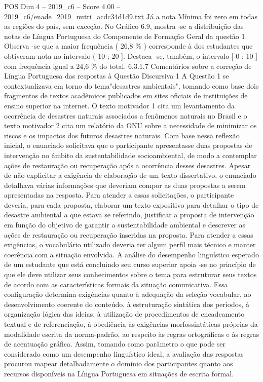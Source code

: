 \begin{textsample}{POS Dim 4 – 2019\_c6 – Score 4.00 – 2019\_c6/enade\_2019\_nutri\_acdc34d1d9.txt}
Já a nota Mínima foi zero em todas as regiões do país, sem exceção.
No Gráfico 6.9, mostra -se a distribuição das notas de Língua Portuguesa do Componente de Formação Geral da questão 1.
Observa -se que a maior frequência ( 26,8 \% ) corresponde à dos estudantes que obtiveram nota no intervalo ( 10 ; 20 ].
Destaca -se, também, o intervalo [ 0 ; 10 ] com frequência igual a 24,6 \% do total. 6.3.1.7 Comentários sobre a correção de Língua Portuguesa das respostas à Questão Discursiva 1 A Questão 1 se contextualizava em torno do tema"desastres ambientais", tomando como base dois fragmentos de textos acadêmicos publicados em sites oficiais de instituições de ensino superior na internet.
O texto motivador 1 cita um levantamento da ocorrência de desastres naturais associados a fenômenos naturais no Brasil e o texto motivador 2 cita um relatório da ONU sobre a necessidade de minimizar os riscos e os impactos dos futuros desastres naturais.
Com base nessa reflexão inicial, o enunciado solicitava que o participante apresentasse duas propostas de intervenção no âmbito da sustentabilidade socioambiental, de modo a contemplar ações de restauração ou recuperação após a ocorrência desses desastres.
Apesar de não explicitar a exigência de elaboração de um texto dissertativo, o enunciado detalhava várias informações que deveriam compor as duas propostas a serem apresentadas na resposta.
Para atender a essas solicitações, o participante deveria, para cada proposta, elaborar um texto expositivo para detalhar o tipo de desastre ambiental a que estava se referindo, justificar a proposta de intervenção em função do objetivo de garantir a sustentabilidade ambiental e descrever as ações de restauração ou recuperação inseridas na proposta.
Para atender a essas exigências, o vocabulário utilizado deveria ter algum perfil mais técnico e manter coerência com a situação envolvida.
A análise do desempenho linguístico esperado de um estudante que está concluindo seu curso superior apoia -se no princípio de que ele deve utilizar seus conhecimentos sobre o tema para estruturar seus textos de acordo com as características formais da situação comunicativa.
Essa configuração determina exigências quanto à adequação da seleção vocabular, ao desenvolvimento coerente do conteúdo, à estruturação sintática dos períodos, à organização lógica das ideias, à utilização de procedimentos de encadeamento textual e de referenciação, à obediência às exigências morfossintáticas próprias da modalidade escrita da norma-padrão, ao respeito às regras ortográficas e às regras de acentuação gráfica.
Assim, tomando como parâmetro o que pode ser considerado como um desempenho linguístico ideal, a avaliação das respostas procurou mapear detalhadamente o domínio dos participantes quanto aos recursos disponíveis na Língua Portuguesa em situações de escrita formal.

\end{textsample}
